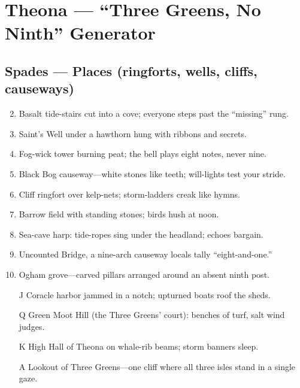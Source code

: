 \chapter{Theona --- ``Three Greens, No Ninth'' Generator}

\section*{Spades --- Places (ringforts, wells, cliffs, causeways)}
\begin{enumerate}
\setcounter{enumi}{1}
\item Basalt tide-stairs cut into a cove; everyone steps past the ``missing'' rung.
\item Saint's Well under a hawthorn hung with ribbons and secrets.
\item Fog-wick tower burning peat; the bell plays eight notes, never nine.
\item Black Bog causeway---white stones like teeth; will-lights test your stride.
\item Cliff ringfort over kelp-nets; storm-ladders creak like hymns.
\item Barrow field with standing stones; birds hush at noon.
\item Sea-cave harp: tide-ropes sing under the headland; echoes bargain.
\item Uncounted Bridge, a nine-arch causeway locals tally ``eight-and-one.''
\item Ogham grove---carved pillars arranged around an absent ninth post.
\item[J] Coracle harbor jammed in a notch; upturned boats roof the sheds.
\item[Q] Green Moot Hill (the Three Greens' court): benches of turf, salt wind judges.
\item[K] High Hall of Theona on whale-rib beams; storm banners sleep.
\item[A] Lookout of Three Greens---one cliff where all three isles stand in a single gaze.
\end{enumerate}

